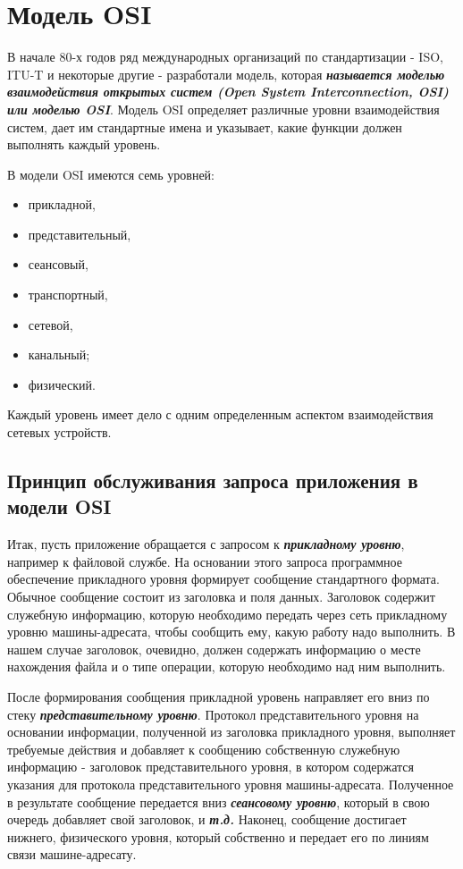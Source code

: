 \section{Модель OSI}

В начале 80-х годов ряд международных организаций по стандартизации - ISO, ITU-T и некоторые другие - разработали модель, которая \textbf{\textit{называется моделью взаимодействия открытых систем (Open System Interconnection, OSI) или моделью OSI}}.
Модель OSI определяет различные уровни взаимодействия систем, дает им стандартные имена и указывает, какие функции должен выполнять каждый уровень.

В модели OSI имеются семь уровней:
\begin{itemize}
    \item прикладной,
    \item представительный,
    \item сеансовый,
    \item транспортный,
    \item сетевой,
    \item канальный;
    \item физический.
\end{itemize}

Каждый уровень имеет дело с одним определенным аспектом взаимодействия сетевых устройств.

\subsection{Принцип обслуживания запроса приложения в модели OSI}

Итак, пусть приложение обращается с запросом к \textbf{\textit{прикладному уровню}}, например к файловой службе.
На основании этого запроса программное обеспечение прикладного уровня формирует сообщение стандартного формата.
Обычное сообщение состоит из заголовка и поля данных.
Заголовок содержит служебную информацию, которую необходимо передать через сеть прикладному уровню машины-адресата, чтобы сообщить ему, какую работу надо выполнить.
В нашем случае заголовок, очевидно, должен содержать информацию о месте нахождения файла и о типе операции, которую необходимо над ним выполнить.

После формирования сообщения прикладной уровень направляет его вниз по стеку \textbf{\textit{представительному уровню}}.
Протокол представительного уровня на основании информации, полученной из заголовка прикладного уровня, выполняет требуемые действия и добавляет к сообщению собственную служебную информацию - заголовок представительного уровня, в котором содержатся указания для протокола представительного уровня машины-адресата.
Полученное в результате сообщение передается вниз \textbf{\textit{сеансовому уровню}}, который в свою очередь добавляет свой заголовок, и \textbf{\textit{т.д.}}
Наконец, сообщение достигает нижнего, физического уровня, который собственно и передает его по линиям связи машине-адресату.

